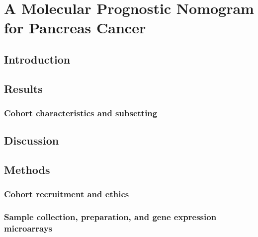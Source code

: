 \documentclass[dissertation.tex]{subfiles}
\begin{document}
\chapter{A Molecular Prognostic Nomogram for Pancreas Cancer}
\label{chap:nomogram}

\section{Introduction}

\section{Results}
\subsection{Cohort characteristics and subsetting}
\label{subsec:nomo-results-cohort}

\section{Discussion}

\section{Methods}
\subsection{Cohort recruitment and ethics}
\label{subsec:nomo-methods-cohort}

\subsection{Sample collection, preparation, and gene expression microarrays}
\label{subsec:nomo-methods-gex}
\end{document}
